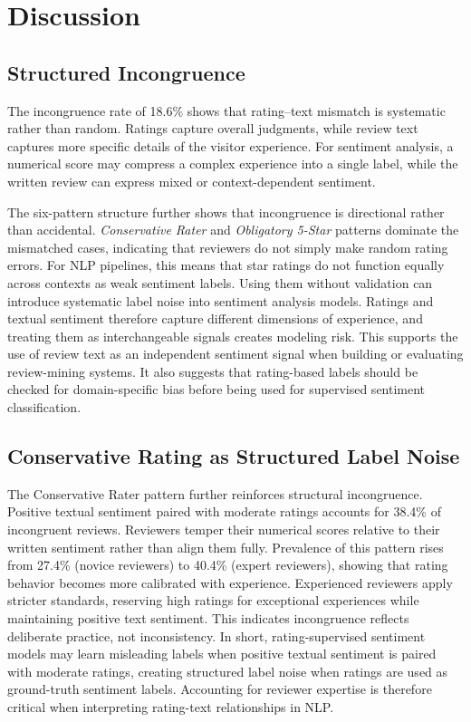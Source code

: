 \documentclass[conference]{IEEEtran}
\begin{document}
\section{Discussion}
\subsection{Structured Incongruence}

The incongruence rate of 18.6\% shows that rating--text mismatch is systematic rather than random. Ratings capture overall judgments, while review text captures more specific details of the visitor experience. For sentiment analysis, a numerical score may compress a complex experience into a single label, while the written review can express mixed or context-dependent sentiment.

The six-pattern structure further shows that incongruence is directional rather than accidental. \textit{Conservative Rater} and \textit{Obligatory 5-Star} patterns dominate the mismatched cases, indicating that reviewers do not simply make random rating errors. For NLP pipelines, this means that star ratings do not function equally across contexts as weak sentiment labels. Using them without validation can introduce systematic label noise into sentiment analysis models. Ratings and textual sentiment therefore capture different dimensions of experience, and treating them as interchangeable signals creates modeling risk. This supports the use of review text as an independent sentiment signal when building or evaluating review-mining systems. It also suggests that rating-based labels should be checked for domain-specific bias before being used for supervised sentiment classification.

\subsection{Conservative Rating as Structured Label Noise}

The Conservative Rater pattern further reinforces structural incongruence. Positive textual sentiment paired with moderate ratings accounts for 38.4\% of incongruent reviews. Reviewers temper their numerical scores relative to their written sentiment rather than align them fully.
Prevalence of this pattern rises from 27.4\% (novice reviewers) to 40.4\% (expert reviewers), showing that rating behavior becomes more calibrated with experience. Experienced reviewers apply stricter standards, reserving high ratings for exceptional experiences while maintaining positive text sentiment. This indicates incongruence reflects deliberate practice, not inconsistency. In short, rating-supervised sentiment models may learn misleading labels when positive textual sentiment is paired with moderate ratings, creating structured label noise when ratings are used as ground-truth sentiment labels. Accounting for reviewer expertise is therefore critical when interpreting rating-text relationships in NLP.
\end{document}
